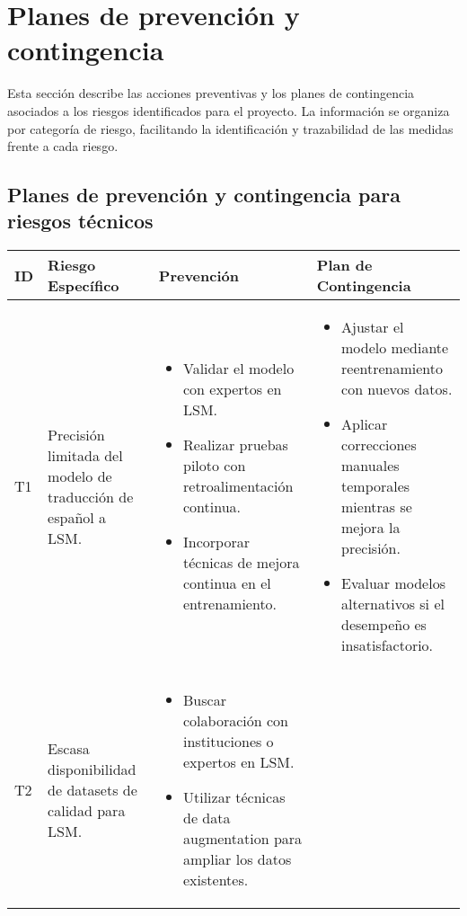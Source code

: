 \section{Planes de prevención y contingencia}

Esta sección describe las acciones preventivas y los planes de contingencia asociados a los riesgos identificados para el proyecto. La información se organiza por categoría de riesgo, facilitando la identificación y trazabilidad de las medidas frente a cada riesgo.

\subsection{Planes de prevención y contingencia para riesgos técnicos}

\begin{longtable}{|>{\centering\arraybackslash}p{0.7cm}|>{\raggedright\arraybackslash}p{4cm}|>{\raggedright\arraybackslash}p{5.5cm}|>{\raggedright\arraybackslash}p{5.5cm}|}
	\hline
	\textbf{ID} & \textbf{Riesgo Específico} & \textbf{Prevención} & \textbf{Plan de Contingencia} \\
	\hline
	T1 & Precisión limitada del modelo de traducción de español a LSM. &
	\begin{itemize}
		\item Validar el modelo con expertos en LSM.
		\item Realizar pruebas piloto con retroalimentación continua.
		\item Incorporar técnicas de mejora continua en el entrenamiento.
	\end{itemize} &
	\begin{itemize}
		\item Ajustar el modelo mediante reentrenamiento con nuevos datos.
		\item Aplicar correcciones manuales temporales mientras se mejora la precisión.
		\item Evaluar modelos alternativos si el desempeño es insatisfactorio.
	\end{itemize} \\
	\hline
	T2 & Escasa disponibilidad de datasets de calidad para LSM. &
	\begin{itemize}
		\item Buscar colaboración con instituciones o expertos en LSM.
		\item Utilizar técnicas de data augmentation para ampliar los datos existentes.
	\end{itemize} &
	\begin{itemize}

\end{itemize}
\end{longtable}

